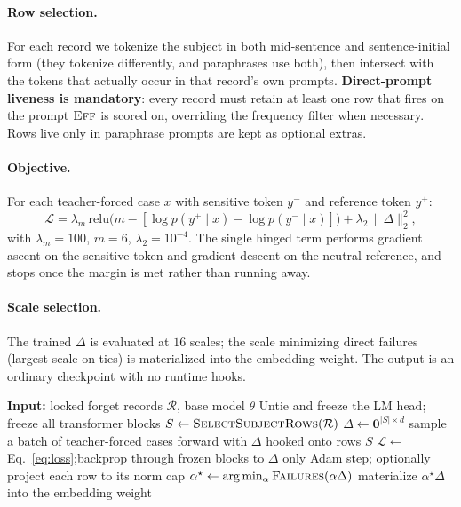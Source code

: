 \documentclass[11pt]{article}
\newcommand{\Eff}{\textsc{Eff}}
\begin{document}
\paragraph{Row selection.} For each record we tokenize the subject in both
mid-sentence and sentence-initial form (they tokenize differently, and
paraphrases use both), then intersect with the tokens that actually occur in
that record's own prompts. \textbf{Direct-prompt liveness is mandatory}: every
record must retain at least one row that fires on the prompt $\Eff$ is scored
on, overriding the frequency filter when necessary. Rows live only in
paraphrase prompts are kept as optional extras.

\paragraph{Objective.} For each teacher-forced case $x$ with sensitive token
$y^{-}$ and reference token $y^{+}$:
\begin{equation}
\mathcal{L}
= \lambda_{m}\,
  \mathrm{relu}\!\big(m - [\log p(y^{+}\mid x) - \log p(y^{-}\mid x)]\big)
+ \lambda_{2}\,\lVert \Delta \rVert_2^2 ,
\label{eq:loss}
\end{equation}
with $\lambda_m = 100$, $m = 6$, $\lambda_2 = 10^{-4}$. The single hinged term
performs gradient ascent on the sensitive token and gradient descent on the
neutral reference, and stops once the margin is met rather than running away.

\paragraph{Scale selection.} The trained $\Delta$ is evaluated at $16$ scales;
the scale minimizing direct failures (largest scale on ties) is materialized
into the embedding weight. The output is an ordinary checkpoint with no runtime
hooks.

\begin{algorithm}[h]
\caption{Stage 1 (subject-keyed embedding unlearning)}
\begin{algorithmic}[1]
\State \textbf{Input:} locked forget records $\mathcal{R}$, base model $\theta$
\State Untie and freeze the LM head; freeze all transformer blocks
\State $S \gets \textsc{SelectSubjectRows}(\mathcal{R})$
\State $\Delta \gets \mathbf{0}^{|S| \times d}$
  \State sample a batch of teacher-forced cases
  \State forward with $\Delta$ hooked onto rows $S$
  \State $\mathcal{L} \gets$ Eq.~\eqref{eq:loss};\quad backprop through frozen blocks to $\Delta$ only
  \State Adam step; optionally project each row to its norm cap
\EndFor
\State $\alpha^\star \gets \arg\min_\alpha \textsc{Failures}(\alpha\Delta)$
\State materialize $\alpha^\star\Delta$ into the embedding weight
\end{algorithmic}
\end{algorithm}
\end{document}
